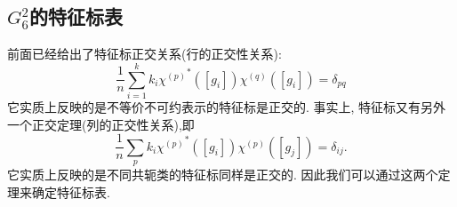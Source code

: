 \documentclass[UTF8]{ctexart}
\begin{document}
\subsection{$G_6^2$的特征标表}
前面已经给出了特征标正交关系(行的正交性关系):
\begin{equation}
  \frac{1}{n} \sum_{i=1}^k k_i {\chi^{(p)}}^{*} ([g_i]) \chi^{(q)}([g_i]) = \delta_{pq}
\end{equation}
它实质上反映的是不等价不可约表示的特征标是正交的. 事实上, 特征标又有另外一个正交定理(列的正交性关系),即
\begin{equation}
  \frac{1}{n} \sum_{p} k_i {\chi^{(p)}}^{*} ([g_i]) \chi^{(p)} ([g_j]) = \delta_{ij}.
\end{equation}
它实质上反映的是不同共轭类的特征标同样是正交的. 因此我们可以通过这两个定理来确定特征标表.
\end{document}

